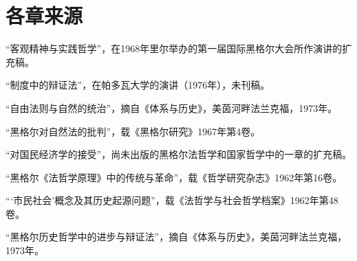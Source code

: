 \chapter*{各章来源}

“客观精神与实践哲学”，在1968年里尔举办的第一届国际黑格尔大会所作演讲的扩充稿。

“制度中的辩证法”，在帕多瓦大学的演讲（1976年），未刊稿。

“自由法则与自然的统治”，摘自《体系与历史》，美茵河畔法兰克福，1973年。

“黑格尔对自然法的批判”，载《黑格尔研究》1967年第4卷。

“对国民经济学的接受”，尚未出版的黑格尔法哲学和国家哲学中的一章的扩充稿。

“黑格尔《法哲学原理》中的传统与革命”，载《哲学研究杂志》1962年第16卷。

“‘市民社会’概念及其历史起源问题”，载《法哲学与社会哲学档案》1962年第48卷。

“黑格尔历史哲学中的进步与辩证法”，摘自《体系与历史》，美茵河畔法兰克福，1973年。